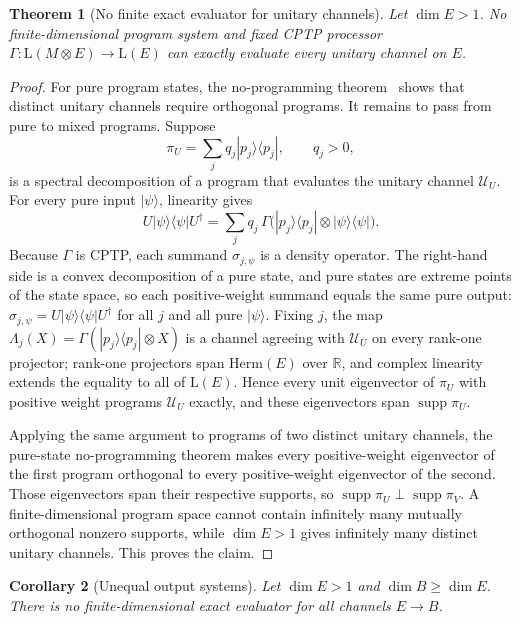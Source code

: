 \documentclass[11pt,a4paper]{article}
\newtheorem{theorem}{Theorem}[section]
\newtheorem{corollary}[theorem]{Corollary}
\newcommand{\Lin}{\mathrm{L}}
\newcommand{\Herm}{\mathrm{Herm}}
\newcommand{\supp}{\operatorname{supp}}
\begin{document}
\begin{theorem}[No finite exact evaluator for unitary channels]
\label{thm:no-programming}
Let $\dim E>1$. No finite-dimensional program system and fixed CPTP processor $\Gamma:\Lin(M\otimes E)\to\Lin(E)$ can exactly evaluate every unitary channel on $E$.
\end{theorem}

\begin{proof}
For pure program states, the no-programming theorem~\cite{NielsenChuang1997} shows that distinct unitary channels require orthogonal programs. It remains to pass from pure to mixed programs. Suppose
\[
\pi_U=\sum_jq_j|p_j\rangle\langle p_j|,\qquad q_j>0,
\]
is a spectral decomposition of a program that evaluates the unitary channel $\mathcal U_U$. For every pure input $|\psi\rangle$, linearity gives
\[
U|\psi\rangle\langle\psi|U^\dagger
=\sum_jq_j\,\Gamma\big(|p_j\rangle\langle p_j|\otimes|\psi\rangle\langle\psi|\big).
\]
Because $\Gamma$ is CPTP, each summand $\sigma_{j,\psi}$ is a density operator. The right-hand side is a convex decomposition of a pure state, and pure states are extreme points of the state space, so each positive-weight summand equals the same pure output: $\sigma_{j,\psi}=U|\psi\rangle\langle\psi|U^\dagger$ for all $j$ and all pure $|\psi\rangle$. Fixing $j$, the map $\Lambda_j(X)=\Gamma(|p_j\rangle\langle p_j|\otimes X)$ is a channel agreeing with $\mathcal U_U$ on every rank-one projector; rank-one projectors span $\Herm(E)$ over $\mathbb R$, and complex linearity extends the equality to all of $\Lin(E)$. Hence every unit eigenvector of $\pi_U$ with positive weight programs $\mathcal U_U$ exactly, and these eigenvectors span $\supp\pi_U$.

Applying the same argument to programs of two distinct unitary channels, the pure-state no-programming theorem makes every positive-weight eigenvector of the first program orthogonal to every positive-weight eigenvector of the second. Those eigenvectors span their respective supports, so $\supp\pi_U\perp\supp\pi_V$. A finite-dimensional program space cannot contain infinitely many mutually orthogonal nonzero supports, while $\dim E>1$ gives infinitely many distinct unitary channels. This proves the claim.
\end{proof}

\begin{corollary}[Unequal output systems]
\label{cor:unequal}
Let $\dim E>1$ and $\dim B\ge\dim E$. There is no finite-dimensional exact evaluator for all channels $E\to B$.
\end{corollary}
\end{document}
